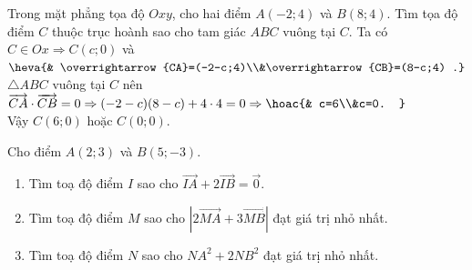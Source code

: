 \begin{bt}%
	Trong mặt phẳng tọa độ $Oxy$, cho hai điểm $A(-2;4)$ và $B(8;4)$. Tìm tọa độ điểm $C$ thuộc trục hoành sao cho tam giác $ABC$ vuông tại $C$.
	\loigiai
	{
		Ta có $C\in Ox\Rightarrow C(c;0)$ và $\heva{& \overrightarrow{CA}=(-2-c;4)\\&\overrightarrow{CB}=(8-c;4) .}$\\
		$\triangle ABC$ vuông tại $C$ nên $\overrightarrow{CA}\cdot\overrightarrow{CB}=0\Rightarrow (-2-c)(8-c)+4\cdot 4=0\Rightarrow\hoac{& c=6\\&c=0. }$\\
		Vậy $C(6;0)$ hoặc $C(0;0)$.
	}
\end{bt}

\begin{bt}
Cho điểm $A(2;3)$ và $B(5;-3)$.
\begin{enumerate}
	\item Tìm toạ độ điểm $I$ sao cho $\vec{IA}+2\vec{IB}=\vec{0}$.
	\item Tìm toạ độ điểm $M$ sao cho $|2\vec{MA}+3\vec{MB}|$ đạt giá trị nhỏ nhất.
	\item Tìm toạ độ điểm $N$ sao cho $NA^2+2NB^2$ đạt giá trị nhỏ nhất.
\end{enumerate}
\end{bt}
